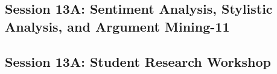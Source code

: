 \subsection{\large Session 13A: Sentiment Analysis, Stylistic Analysis, and Argument Mining-11}
\label{parallel-session-13A-trackH}
\TrackHLoc\hfill\sessionchair{}{}
\clearpage
\subsection{\large Session 13A: Student Research Workshop}
\label{parallel-session-13A-trackI}
\TrackILoc\hfill\sessionchair{}{}
\clearpage


